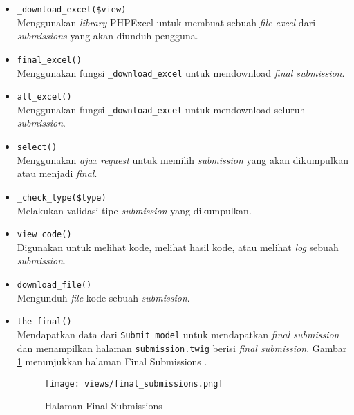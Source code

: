 \begin{itemize}
            \begin{itemize}
                  \item \verb|_download_excel($view)| \\
                        Menggunakan \textit{library} PHPExcel untuk membuat sebuah \textit{file excel} dari \textit{submissions} yang akan diunduh pengguna.
                  \item \verb|final_excel()| \\
                        Menggunakan fungsi \verb|_download_excel| untuk mendownload \textit{final submission}.
                  \item \verb|all_excel()| \\
                        Menggunakan fungsi \verb|_download_excel| untuk mendownload seluruh \textit{submission}.
                  \item \verb|select()| \\
                        Menggunakan \textit{ajax request} untuk memilih \textit{submission} yang akan dikumpulkan atau menjadi \textit{final}.
                  \item \verb|_check_type($type)| \\
                        Melakukan validasi tipe \textit{submission} yang dikumpulkan.
                  \item \verb|view_code()| \\
                        Digunakan untuk melihat kode, melihat hasil kode, atau melihat \textit{log} sebuah \textit{submission}.
                  \item \verb|download_file()| \\
                        Mengunduh \textit{file} kode sebuah \textit{submission}.
                  \item \verb|the_final()| \\
                        Mendapatkan data dari \verb|Submit_model| untuk mendapatkan \textit{final submission} dan menampilkan halaman \verb|submission.twig| berisi \textit{final submission}. Gambar \ref{fig:3:1:1:final} menunjukkan halaman Final Submissions .
                        \begin{figure}[H]
                              \centering
                              \texttt{[image: views/final\_submissions.png]}
                              \caption{Halaman Final Submissions}
                              \label{fig:3:1:1:final}
                        \end{figure}


\end{itemize}
\end{itemize}
